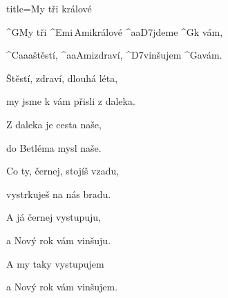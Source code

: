 \begin{song}{title=\predtitle\centering My tři králové \\\large   \vspace*{-0.3cm}}  %
\begin{centerjustified}
\nejnejvetsi

\sloka
	^{G}My tři ^{Emi\,Ami}králové ^{{\color{white}aa}D7}jdeme ^{G}k vám,

	^{C{\color{white}aaa}}štěstí, ^{{\color{white}aa}Ami}zdraví, ^{D7}vinšujem ^{G{\color{white}a}}vám.

\sloka
	Štěstí, zdraví, dlouhá léta,

	my jsme k vám přisli z daleka.

\sloka
	Z daleka je cesta naše,

	do Betléma mysl naše.

\sloka
	Co ty, černej, stojíš vzadu,

	vystrkuješ na nás bradu.

\sloka
	A já černej vystupuju,

	a Nový rok vám vinšuju.

\sloka
	A my taky vystupujem

	a Nový rok vám vinšujem.



\end{centerjustified}
\setcounter{Slokočet}{0}
\end{song}

